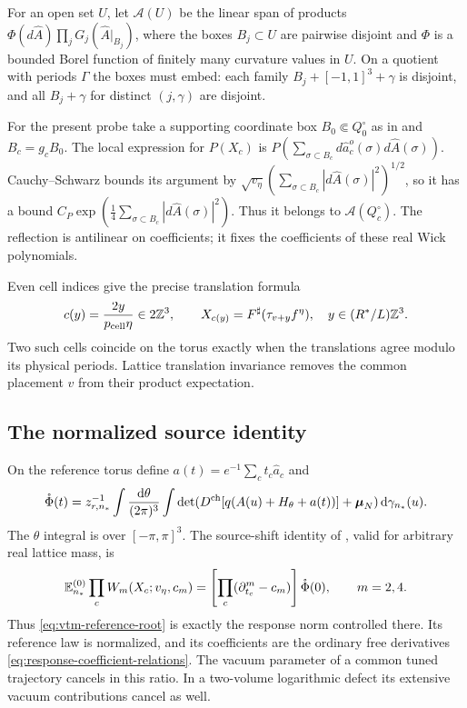 For an open set $U$, let $\mathcal A(U)$ be the linear span
of products $\Phi(d\widehat A)\prod_jG_j(\widehat A|_{B_j})$,
where the boxes $B_j\subset U$ are pairwise disjoint and
$\Phi$ is a bounded Borel function of finitely many curvature
values in $U$. On a quotient with periods $\Gamma$ the boxes
must embed: each family $B_j+[-1,1]^3+\gamma$ is disjoint,
and all $B_j+\gamma$ for distinct $(j,\gamma)$ are disjoint.

For the present probe take a supporting coordinate box
$B_0\Subset Q_0^\circ$ as in \cite[\S2.2]{ReferenceResponse}
and $B_c=g_cB_0$. The local expression for $P(X_c)$ is
$P(\sum_{\sigma\subset B_c}d\widehat a_c^o(\sigma)
                                      d\widehat A(\sigma))$.
Cauchy--Schwarz bounds its argument by
$\sqrt{v_\eta}(\sum_{\sigma\subset B_c}|d\widehat A(\sigma)|^2)^{1/2}$,
so it has a bound
$C_P\exp(\frac14\sum_{\sigma\subset B_c}|d\widehat A(\sigma)|^2)$.
Thus it belongs to $\mathcal A(Q_c^\circ)$.
The reflection is antilinear on coefficients; it fixes the
coefficients of these real Wick polynomials.

Even cell indices give the precise translation formula
\begin{equation}\label{eq:cells-translation-observable}
 c(y)=\frac{2y}{p_{\rm cell}\eta}\in2\mathbb Z^3,\qquad
 X_{c(y)}=F^\sharp(\tau_{v+y}f^\eta),
 \quad y\in(R^*/L)\mathbb Z^3.
\end{equation}
Two such cells coincide on the torus exactly when the
translations agree modulo its physical periods. Lattice
translation invariance removes the common placement $v$
from their product expectation.

\subsection{The normalized source identity}

On the reference torus define $a(t)=e^{-1}\sum_ct_c\widehat a_c$ and
\begin{equation}\label{eq:external-reference-partition}
 \mathring\Phi(t)=z_{r,n_*}^{-1}
 \int\frac{\mathrm d\theta}{(2\pi)^3}\int
 \det(D^{\rm ch}[q(A(u)+H_\theta+a(t))]
                         +\boldsymbol\mu_N)\,\mathrm d\gamma_{n_*}(u).
\end{equation}
The $\theta$ integral is over $[-\pi,\pi]^3$.
The source-shift identity of
\cite[\S3.6, Proposition~3.2 and (53)]{ReferenceResponse},
valid for arbitrary real lattice mass, is
\begin{equation}\label{eq:external-Wick-product}
 \mathbb E^{(0)}_{n_*}\prod_c W_m(X_c;v_\eta,c_m)
       =\left[\prod_c(\partial_{t_c}^m-c_m)\right]\mathring\Phi(0),
       \qquad m=2,4.
\end{equation}
Thus \eqref{eq:vtm-reference-root} is exactly the response norm
controlled there. Its reference law is normalized, and its
coefficients are the ordinary free derivatives
\eqref{eq:response-coefficient-relations}. The vacuum parameter
of a common tuned trajectory cancels in this ratio. In a
two-volume logarithmic defect its extensive vacuum contributions
cancel as well.

